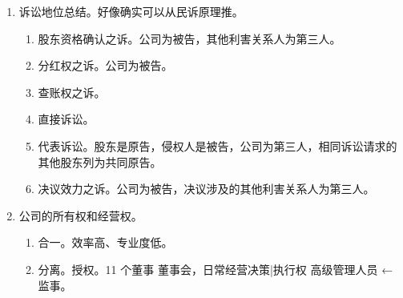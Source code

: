 \begin{enumerate}
\begin{enumerate}
\begin{enumerate}
                  \item 因此不应适用法人人格否认制度。
                \end{enumerate}
        \end{enumerate}
  \item 诉讼地位总结。好像确实可以从民诉原理推。
        \begin{enumerate}
          \item 股东资格确认之诉。公司为被告，其他利害关系人为第三人。
          \item 分红权之诉。公司为被告。
          \item 查账权之诉。
          \item 直接诉讼。
          \item 代表诉讼。股东是原告，侵权人是被告，公司为第三人，相同诉讼请求的其他股东列为共同原告。
          \item 决议效力之诉。公司为被告，决议涉及的其他利害关系人为第三人。
        \end{enumerate}
  \item 公司的所有权和经营权。
        \begin{enumerate}
          \item 合一。效率高、专业度低。
          \item 分离。授权。11 个董事 \yjt 董事会，日常经营决策|执行权 \yjt 高级管理人员 ← 监事。
        \end{enumerate}
\end{enumerate}
